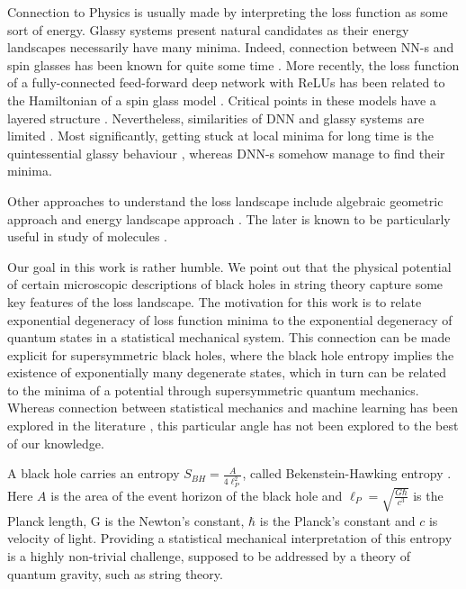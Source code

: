 \documentclass[12pt,a4paper]{JHEP3}
\begin{document}
Connection to Physics is usually made by interpreting the loss function as some sort of energy. Glassy systems present natural candidates as their energy landscapes necessarily have many minima. Indeed, connection between NN-s and spin glasses has been known for quite some time \cite{PhysRevA.32.1007, Nakanishi_1997}. 
More recently, the loss function of a fully-connected feed-forward deep network with ReLUs  has been related to the Hamiltonian of a spin glass model \cite{choromanska2015loss, pmlr-v38-choromanska15, pmlr-v40-Choromanska15}. Critical points in these models have a layered structure \cite{auffinger2011random, Auffinger_2013}. 
Nevertheless, similarities of DNN and glassy systems are limited \cite{Baity_Jesi_2019}. Most significantly, getting stuck at local minima for long time is the quintessential glassy behaviour \cite{bouchaud1997equilibrium, cugliandolo2002dynamics, Berthier_2011}, whereas  DNN-s somehow manage to find their minima. 

Other approaches to understand the loss landscape include algebraic geometric approach \cite{mehta2018loss} and energy landscape approach \cite{C7CP01108C}. The later is known to be particularly useful in study of molecules \cite{Wales}.

Our goal in this work is rather humble. We point out that the physical potential of certain microscopic descriptions of black holes in string theory capture some key features of the loss landscape. 
The motivation for this work is to relate exponential degeneracy of loss function minima to the exponential degeneracy of quantum states in a statistical mechanical system.  This connection can be made explicit for supersymmetric black holes, where the black hole entropy implies the existence of exponentially many degenerate states, which in turn can be related to the minima of a potential through supersymmetric quantum mechanics.
Whereas connection between statistical mechanics and machine learning has been explored in the literature  \cite{doi:10.1146/annurev-statistics-032921-013738, doi:10.1146/annurev-conmatphys-031119-050745}, this particular  angle has not been  explored to the best of our knowledge. 



A black hole carries an entropy $S_{BH} = \frac{A}{4 \ell_P^2}$, called Bekenstein-Hawking entropy \cite{Bekenstein1, Bekenstein2, BCH, Hawking75}. Here $A$ is the area of the event horizon of the black hole and $\ell_P= \sqrt{\frac{G \hbar}{c^3}}$ is the Planck length, G is the Newton's constant, $\hbar$ is the  Planck's constant and $c$ is velocity of light. Providing  a statistical mechanical interpretation of this entropy is a highly non-trivial challenge, supposed to be addressed by a theory of quantum gravity, such as string theory. 
\end{document}
